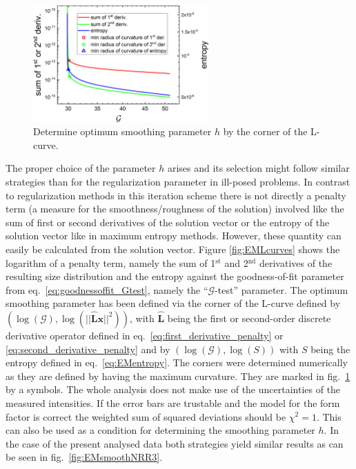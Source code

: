 \begin{figure}[htb]
\centering
\includegraphics[width=0.6\textwidth]{../images/form_factor/EM/EMsmoothLcurves.png}
\caption{Determine optimum smoothing parameter $h$ by the corner of the L-curve.\label{fig:EMhLcurve}}
\end{figure}

The proper choice of the parameter $h$ arises and its selection might follow similar strategies than for the regularization parameter in ill-posed problems. In contrast to regularization methods in this iteration scheme there is not directly a penalty term (a measure for the smoothness/roughness of the solution) involved like the sum of first or second derivatives of the solution vector or the entropy of the solution vector like in maximum entropy methods. However, these quantity can easily be calculated from the solution vector. Figure \ref{fig:EMLcurves} shows the logarithm of a penalty term, namely the sum of 1$^\mathrm{st}$ and 2$^\mathrm{nd}$ derivatives of the resulting size distribution and the entropy against the goodness-of-fit parameter from eq.\ \ref{eq:goodnessoffit_Gtest}, namely the ``$\mathcal{G}$-test'' parameter. The optimum smoothing parameter has been defined via the corner of the L-curve defined by $(\log(\mathcal{G}),\log(|| \hat{\mathbf{L}} \mathbf{x} ||^2))$, with $\hat{\mathbf{L}}$ being the first or second-order discrete derivative operator defined in eq.\ \ref{eq:first_derivative_penalty} or \ref{eq:second_derivative_penalty} and by $(\log(\mathcal{G}),\log(S))$ with $S$ being the entropy defined in eq.\ \ref{eq:EMentropy}. The corners were determined numerically as they are defined by having the maximum curvature. They are marked in fig.\ \ref{fig:EMhLcurve} by a symbols. The whole analysis does not make use of the uncertainties of the measured intensities. If the error bars are trustable and the model for the form factor is correct the weighted sum of squared deviations should be $\chi^2= 1$. This can also be used as a condition for determining the smoothing parameter $h$. In the case of the present analysed data both strategies yield similar results as can be seen in fig.\ \ref{fig:EMsmoothNRR3}.

